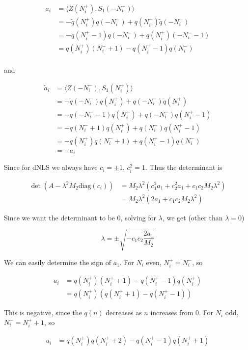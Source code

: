 \documentclass[12pt]{article}
\begin{document}
\begin{align*}
a_i &= \langle Z(N_i^+), S_1(-N_i^-) \rangle \\
&= -\tilde{q}(N_i^+)q(-N_i^-) + q(N_i^+)\tilde{q}(-N_i^-) \\
&= -q(N_i^+ - 1)q(-N_i^-) + q(N_i^+)(-N_i^- - 1) \\
&= q(N_i^+)(N_i^- + 1) - q(N_i^+ - 1)q(N_i^-)\\
\end{align*}

and

\begin{align*}
\tilde{a}_i &= \langle Z(-N_i^-), S_1(N_i^+) \rangle \\
&= -\tilde{q}(-N_i^-)q(N_i^+) + q(-N_i^-)\tilde{q}(N_i^+) \\
&= -q(-N_i^- - 1)q(N_i^+) + q(-N_i^-)q(N_i^+ - 1) \\
&= -q(N_i^- + 1)q(N_i^+) + q(N_i^-)q(N_i^+ - 1) \\
&= -q(N_i^+)q(N_i^- + 1) + q(N_i^+ - 1)q(N_i^-) \\
&= -a_i
\end{align*}

Since for dNLS we always have $c_i = \pm 1$, $c_i^2 = 1$. Thus the determinant is

\begin{align*}
\det( A - \lambda^2 M_2 \text{diag}(c_i)) &= 
M_2 \lambda^2 ( c_1^2 a_1 + c_2^2 a_1 + c_1 c_2 M_2 \lambda^2 ) \\
&= M_2 \lambda^2 ( 2 a_1 + c_1 c_2 M_2 \lambda^2 )
\end{align*}

Since we want the determinant to be 0, solving for $\lambda$, we get (other than $\lambda = 0$)

\[
\lambda = \pm \sqrt{ -c_1 c_2 \frac{2 a_1}{M_2}}
\]

We can easily determine the sign of $a_1$. For $N_i$ even, $N_i^+ = N_i^-$, so

\begin{align*}
a_i &= q(N_i^+)(N_i^+ + 1) - q(N_i^+ - 1)q(N_i^+)\\
&= q(N_i^+)( q(N_i^+ + 1) - q(N_i^+ - 1))
\end{align*} 

This is negative, since the $q(n)$ decreases as $n$ increases from 0. For $N_i$ odd, $N_i^- = N_i^+ +1$, so

\begin{align*}
a_i &= q(N_i^+)q(N_i^+ + 2) - q(N_i^+ - 1)q(N_i^+ + 1)\\
\end{align*}
\end{document}
